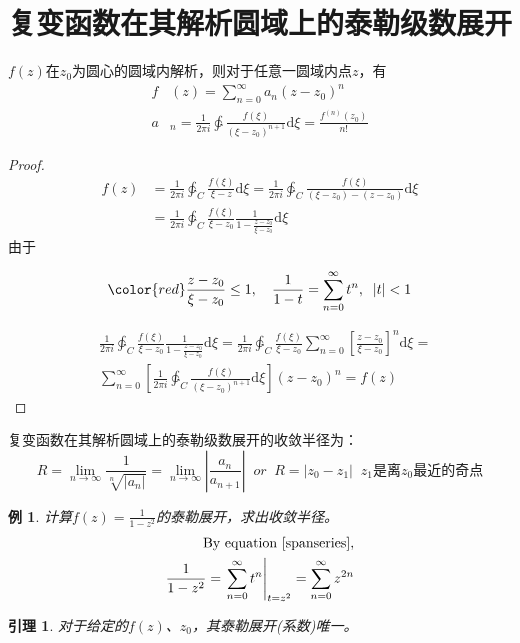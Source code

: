 \documentclass[10pt, a4paper, oneside]{ctexbook}
\newtheorem{lemma}[theorem]{引理}
\newtheorem{example}[theorem]{例}
\def\D{\mathrm{d}}
\newcommand{\F}[1][z]
{\ensuremath{f(#1)}}
\begin{document}
\section{复变函数在其解析圆域上的泰勒级数展开}
    $\F$在$z_0$为圆心的圆域内解析，则对于任意一圆域内点$z$，有
    \begin{align*}
        f&(z)=\sum_{n=0}^\infty a_n(z-z_0)^n\\
        a&_n=\frac{1}{2\pi i}\ointctrclockwise \frac{\F[\xi]}{(\xi-z_0)^{n+1}}\D \xi=\frac{f^{(n)}(z_0)}{n!}
    \end{align*}
\begin{proof}
    \begin{align*}
        \F&=\frac{1}{2\pi i}\ointctrclockwise_C \frac{\F[\xi]}{\xi-z}\D \xi=\frac{1}{2\pi i}\ointctrclockwise_C \frac{\F[\xi]}{(\xi-z_0)-(z-z_0)}\D \xi\\
        &=\frac{1}{2\pi i}\ointctrclockwise_C \frac{\F[\xi]}{\xi-z_0}\frac{1}{1-\frac{z-z_0}{\xi-z_0}}\D \xi
    \end{align*}
    由于
    
  
  \begin{equation}
        \label{spanseries}
        \color{red}
        \frac{z-z_0}{\xi-z_0}\le 1,\quad\frac{1}{1-t}=\sum_{n=0}^\infty t^n,\;\; |t|<1
  \end{equation}
    
    \begin{align*}
    &\frac{1}{2\pi i}\ointctrclockwise_C \frac{\F[\xi]}{\xi-z_0}\frac{1}{1-\frac{z-z_0}{\xi-z_0}}\D \xi=\frac{1}{2\pi i}\ointctrclockwise_C \frac{\F[\xi]}{\xi-z_0}\sum_{n=0}^\infty \left[\frac{z-z_0}{\xi-z_0}\right]^n\D \xi=\\
    &\sum_{n=0}^\infty \left[\frac{1}{2\pi i}\ointctrclockwise_C \frac{\F[\xi]}{(\xi-z_0)^{n+1}}\D \xi\right](z-z_0)^n=\F
    \end{align*}
\end{proof}
复变函数在其解析圆域上的泰勒级数展开的收敛半径为：
$$
R=\lim_{n\to \infty}\frac{1}{\sqrt[n]{|a_n|}}=\lim_{n\to \infty} \left| \frac{a_n}{a_{n+1}} \right| \;\; or \;\; R=|z_0-z_1| \;\; \text{$z_1$是离$z_0$最近的奇点}
$$
\begin{example}
    计算$f(z)=\frac{1}{1-z^2}$的泰勒展开，求出收敛半径。
    \begin{align*}
        \rm
        \text{By equation \ref{spanseries},}\\
        \frac{1}{1-z^2}=\left. \sum_{n=0}^\infty t^n \right|_{t=z^2}=\sum_{n=0}^\infty z^{2n}
    \end{align*}
\end{example}
\begin{lemma}
    对于给定的$f(z)$、$z_0$，其泰勒展开(系数)唯一。
\end{lemma}
\end{document}
